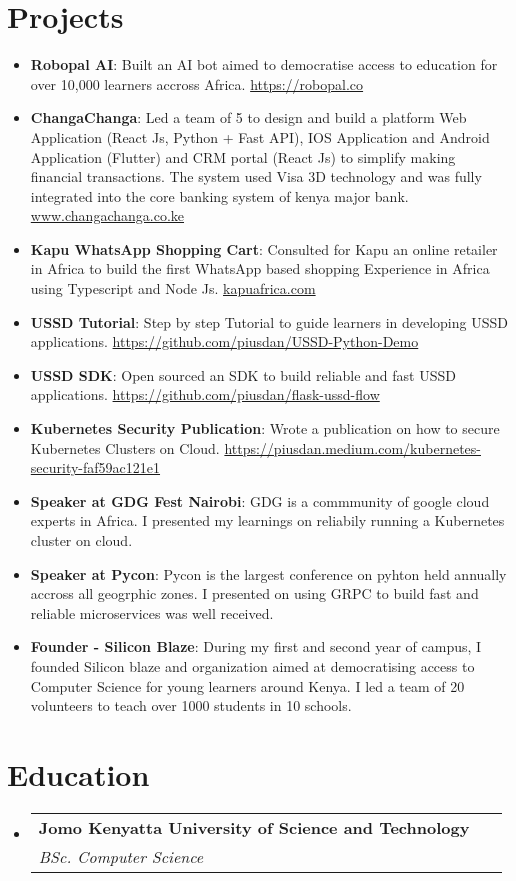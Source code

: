 \documentclass[letterpaper,11pt]{article}
\makeatletter
\newcommand{\resumeItem}[2]{
  \item\small{
    \textbf{#1}{: #2 \vspace{-2pt}}
  }
}
\newcommand{\resumeSubheading}[4]{
  \vspace{-1pt}\item
    \begin{tabular*}{0.97\textwidth}{l@{\extracolsep{\fill}}r}
      \textbf{#1} & #2 \\
      \textit{\small#3} & \textit{\small #4} \\
    \end{tabular*}\vspace{-5pt}
}
\newcommand{\resumeSubItem}[2]{\resumeItem{#1}{#2}\vspace{-4pt}}
\newcommand{\resumeSubHeadingListStart}{\begin{itemize}[leftmargin=*]}
\newcommand{\resumeSubHeadingListEnd}{\end{itemize}}
\makeatother
\begin{document}
\section{Projects}
  \resumeSubHeadingListStart  	
	  \resumeSubItem {Robopal AI}
	  {Built an AI bot aimed to democratise access to education for over 10,000 learners accross Africa. \href{https://robopal.co}{https://robopal.co}}
	\resumeSubItem {ChangaChanga}
	{Led a team of 5 to design and build a platform Web Application (React Js, Python + Fast API), IOS Application and Android Application (Flutter) and CRM portal (React Js) to simplify making financial transactions. The system used Visa 3D technology and was fully integrated into the core banking system of kenya major bank. \href{https://changachanga.co.ke}{www.changachanga.co.ke}}
\resumeSubItem{Kapu WhatsApp Shopping Cart}
{Consulted for Kapu an online retailer in Africa to build the first WhatsApp based shopping Experience in Africa using Typescript and Node Js. \href{https://kapuafrica.com}{kapuafrica.com}}
    \resumeSubItem{USSD Tutorial}
      {Step by step Tutorial to guide learners in developing USSD applications. \href{https://github.com/piusdan/USSD-Python-Demo}{https://github.com/piusdan/USSD-Python-Demo}}
    \resumeSubItem{USSD SDK}
      {Open sourced an SDK to build reliable and fast USSD applications. \href{https://github.com/piusdan/flask-ussd-flow}{https://github.com/piusdan/flask-ussd-flow}}
    \resumeSubItem{Kubernetes Security Publication}
      {Wrote a publication on how to secure Kubernetes Clusters on Cloud. \href{https://piusdan.medium.com/kubernetes-security-faf59ac121e1}{https://piusdan.medium.com/kubernetes-security-faf59ac121e1}}
  	\resumeSubItem{Speaker at GDG Fest Nairobi}
      {GDG is a commmunity of google cloud experts in Africa. I presented my learnings on reliabily running a Kubernetes cluster on cloud.}
  	\resumeSubItem{Speaker at Pycon}
      {Pycon is the largest conference on pyhton held annually accross all geogrphic zones. I presented on using GRPC to build fast and reliable microservices was well received.}
    \resumeSubItem{Founder - Silicon Blaze}
      {During my first and second year of campus, I founded Silicon blaze and organization aimed at democratising access to Computer Science for young learners around Kenya. I led a team of 20 volunteers to teach over 1000 students in 10 schools.}
  \resumeSubHeadingListEnd

\section{Education}
  \resumeSubHeadingListStart
    \resumeSubheading
      {Jomo Kenyatta University of Science and Technology}{}
      {BSc. Computer Science}\
  \resumeSubHeadingListEnd

\end{document}
